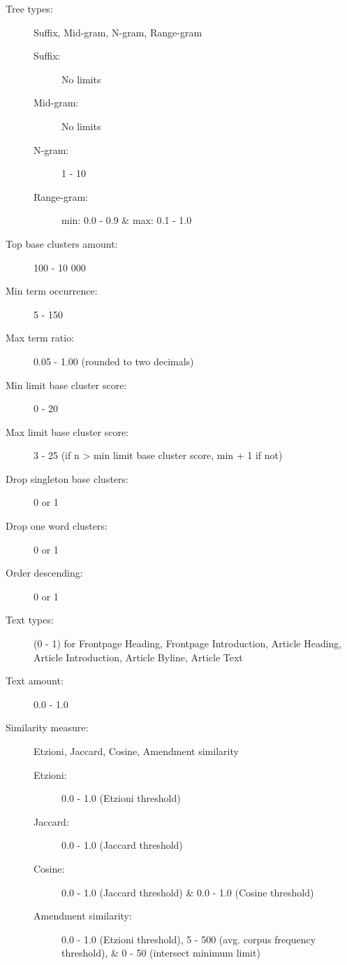 \begin{description}
  \item[Tree types:] Suffix, Mid-gram, N-gram, Range-gram\hfill
  	\begin{description}
	  \item[Suffix:] No limits
	  \item[Mid-gram:] No limits
	  \item[N-gram:] 1 - 10
	  \item[Range-gram:] min: 0.0 - 0.9 \& max: 0.1 - 1.0
	\end{description}
  \item[Top base clusters amount:] 100 - 10 000
  \item[Min term occurrence:] 5 - 150
  \item[Max term ratio:] 0.05 - 1.00 (rounded to two decimals)
  \item[Min limit base cluster score:] 0 - 20
  \item[Max limit base cluster score:] 3 - 25 (if n > min limit base cluster score, min + 1 if not)
  \item[Drop singleton base clusters:] 0 or 1
  \item[Drop one word clusters:] 0 or 1
  \item[Order descending:] 0 or 1
  \item[Text types:] (0 - 1) for Frontpage Heading, Frontpage Introduction, Article Heading, Article Introduction, Article Byline, Article Text
  \item[Text amount:] 0.0 - 1.0
  \item[Similarity measure:] Etzioni, Jaccard, Cosine, Amendment similarity\hfill
  	\begin{description}
	  \item[Etzioni:] 0.0 - 1.0 (Etzioni threshold)
	  \item[Jaccard:] 0.0 - 1.0 (Jaccard threshold)
	  \item[Cosine:] 0.0 - 1.0 (Jaccard threshold) \& 0.0 - 1.0 (Cosine threshold)
	  \item[Amendment similarity:] 0.0 - 1.0 (Etzioni threshold), 5 - 500 (avg. corpus frequency threshold), \& 0 - 50 (intersect minimum limit) 
	\end{description}
\end{description}

